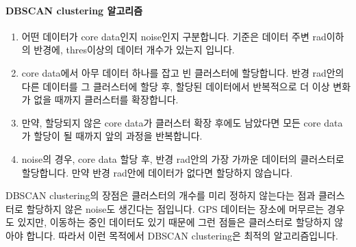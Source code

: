 \documentclass{oblivoir}
\begin{document}
  \paragraph{DBSCAN clustering 알고리즘}
  \begin{enumerate}
    \item 어떤 데이터가 core data인지 noise인지 구분합니다. 기준은 데이터 주변 rad이하의 반경에, thres이상의 데이터 개수가 있는지 입니다.
    \item core data에서 아무 데이터 하나를 잡고 빈 클러스터에 할당합니다. 반경 rad안의 다른 데이터를 그 클러스터에 할당 후, 할당된 데이터에서 반복적으로 더 이상 변화가 없을 때까지 클러스터를 확장합니다.
    \item 만약, 할당되지 않은 core data가 클러스터 확장 후에도 남았다면 모든 core data가 할당이 될 때까지 앞의 과정을 반복합니다.
    \item noise의 경우, core data 할당 후, 반경 rad안의 가장 가까운 데이터의 클러스터로 할당합니다. 만약 반경 rad안에 데이터가 없다면 할당하지 않습니다.
  \end{enumerate}
  DBSCAN clustering의 장점은 클러스터의 개수를 미리 정하지 않는다는 점과 클러스터로 할당하지 않은 noise도 생긴다는 점입니다.
  GPS 데이터는 장소에 머무르는 경우도 있지만, 이동하는 중인 데이터도 있기 때문에 그런 점들은 클러스터로 할당하지 않아야 합니다.
  따라서 이런 목적에서 DBSCAN clustering은 최적의 알고리즘입니다.
\end{document}
